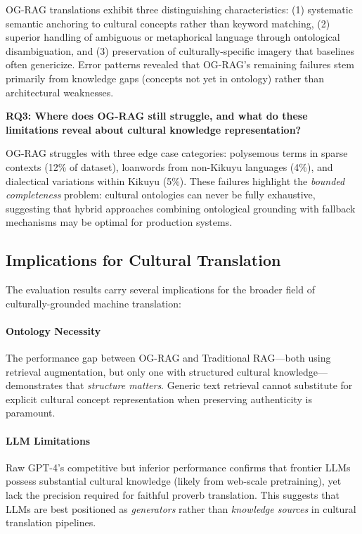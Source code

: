 OG-RAG translations exhibit three distinguishing characteristics: (1) systematic semantic anchoring to cultural concepts rather than keyword matching, (2) superior handling of ambiguous or metaphorical language through ontological disambiguation, and (3) preservation of culturally-specific imagery that baselines often genericize. Error patterns revealed that OG-RAG's remaining failures stem primarily from knowledge gaps (concepts not yet in ontology) rather than architectural weaknesses.

\textbf{RQ3: Where does OG-RAG still struggle, and what do these limitations reveal about cultural knowledge representation?}

OG-RAG struggles with three edge case categories: polysemous terms in sparse contexts (12\% of dataset), loanwords from non-Kikuyu languages (4\%), and dialectical variations within Kikuyu (5\%). These failures highlight the \emph{bounded completeness} problem: cultural ontologies can never be fully exhaustive, suggesting that hybrid approaches combining ontological grounding with fallback mechanisms may be optimal for production systems.

\subsection{Implications for Cultural Translation}
\label{subsec:implications}

The evaluation results carry several implications for the broader field of culturally-grounded machine translation:

\paragraph{Ontology Necessity} The performance gap between OG-RAG and Traditional RAG—both using retrieval augmentation, but only one with structured cultural knowledge—demonstrates that \emph{structure matters}. Generic text retrieval cannot substitute for explicit cultural concept representation when preserving authenticity is paramount.

\paragraph{LLM Limitations} Raw GPT-4's competitive but inferior performance confirms that frontier LLMs possess substantial cultural knowledge (likely from web-scale pretraining), yet lack the precision required for faithful proverb translation. This suggests that LLMs are best positioned as \emph{generators} rather than \emph{knowledge sources} in cultural translation pipelines.

